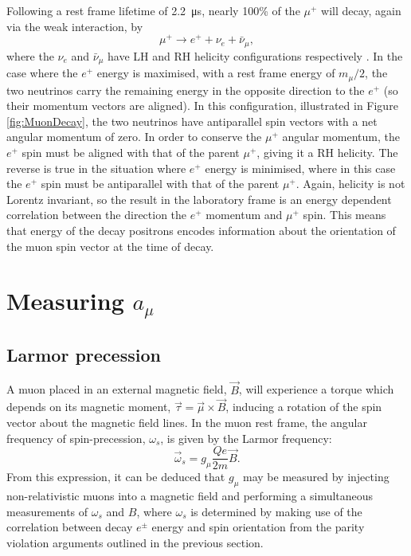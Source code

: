 Following a rest frame lifetime of \SI{2.2}{\micro\second}, nearly 100\% of the $\mu^{+}$ will decay, again via the weak interaction, by
%
\begin{equation}
  \mu^{+} \rightarrow e^{+}+\nu_{e}+\bar{\nu}_{\mu},
  \label{eqn:MuonDecay}
\end{equation}
%
where the $\nu_{e}$ and $\bar{\nu}_{\mu}$ have LH and RH helicity configurations respectively \cite{PDG2018}. In the case where the $e^{+}$ energy is maximised, with a rest frame energy of $m_{\mu}/2$, the two neutrinos carry the remaining energy in the opposite direction to the $e^{+}$ (so their momentum vectors are aligned). In this configuration, illustrated in Figure \ref{fig:MuonDecay}, the two neutrinos have antiparallel spin vectors with a net angular momentum of zero. In order to conserve the $\mu^{+}$ angular momentum, the $e^{+}$ spin must be aligned with that of the parent $\mu^{+}$, giving it a RH helicity. The reverse is true in the situation where $e^{+}$ energy is minimised, where in this case the $e^{+}$ spin must be antiparallel with that of the parent $\mu^{+}$. Again, helicity is not Lorentz invariant, so the result in the laboratory frame is an energy dependent correlation between the direction the $e^{+}$ momentum and $\mu^{+}$ spin. This means that energy of the decay positrons encodes information about the orientation of the muon spin vector at the time of decay. %

\section{Measuring $a_{\mu}$}

\subsection{Larmor precession}\label{sec:LarmorPrecession}

A muon placed in an external magnetic field, $\vec{B}$, will experience a torque which depends on its magnetic moment, $\vec{\tau}=\vec{\mu}\times\vec{B}$, inducing a rotation of the spin vector about the magnetic field lines. In the muon rest frame, the angular frequency of spin-precession, $\omega_{s}$, is given by the Larmor frequency:
%
\begin{equation} 
  \vec{\omega}_{s} = g_{\mu}\frac{Qe}{2m}\vec{B}.
  \label{eqn:Larmor}
\end{equation}
%
From this expression, it can be deduced that $g_{\mu}$ may be measured by injecting non-relativistic muons into a magnetic field and performing a simultaneous measurements of $\omega_{s}$ and $B$, where $\omega_{s}$ is determined by making use of the correlation between decay $e^{\pm}$ energy and spin orientation from the parity violation arguments outlined in the previous section. 

